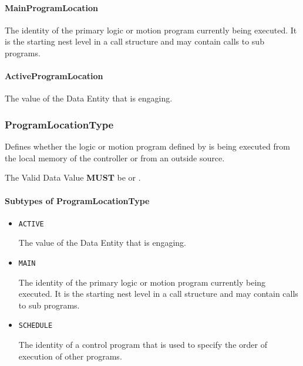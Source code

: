 \paragraph{MainProgramLocation}\mbox{}
\label{sec:MainProgramLocation}


The identity of the primary logic or motion program currently being executed. It is the starting nest level in a call structure and may contain calls to sub programs.


\paragraph{ActiveProgramLocation}\mbox{}
\label{sec:ActiveProgramLocation}


The value of the \gls{Data Entity} that is engaging.


\subsubsection{ProgramLocationType}
\label{sec:ProgramLocationType}



Defines whether the logic or motion program defined by  is being executed from the local memory of the controller or from an outside source.
  
 The \gls{Valid Data Value} \textbf{MUST} be  or .


\paragraph{Subtypes of ProgramLocationType}\mbox{}
\label{sec:Subtypes of ProgramLocationType}

\begin{itemize}

\item \texttt{ACTIVE}


The value of the \gls{Data Entity} that is engaging.

\item \texttt{MAIN}


The identity of the primary logic or motion program currently being executed. It is the starting nest level in a call structure and may contain calls to sub programs.

\item \texttt{SCHEDULE}


The identity of a control program that is used to specify the order of execution of other programs.


\end{itemize}

